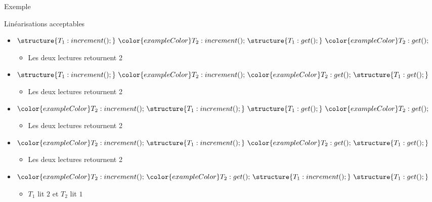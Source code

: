\begin{frame}[fragile]{Exemple}
\begin{center}
{\begin{tikzpicture}
      \end{tikzpicture}
    }
  \end{center}
  \pause
  \begin{alertblock}{Linéarisations acceptables}
    \begin{itemize}
    \item $\structure{T_1:increment();}~{\color{exampleColor}T_2:increment();}~\structure{T_1:get();}~{\color{exampleColor}T_2:get();}$
      \begin{itemize}
      \item Les deux lectures retournent 2
      \end{itemize}
      \pause
    \item $\structure{T_1:increment();}~{\color{exampleColor}T_2:increment();}~{\color{exampleColor}T_2:get();}~\structure{T_1:get();}$
      \begin{itemize}
      \item Les deux lectures retournent 2
      \end{itemize}
      \pause
    \item ${\color{exampleColor}T_2:increment();}~\structure{T_1:increment();}~\structure{T_1:get();}~{\color{exampleColor}T_2:get();}$
      \begin{itemize}
      \item Les deux lectures retournent 2
      \end{itemize}
      \pause
    \item ${\color{exampleColor}T_2:increment();}~\structure{T_1:increment();}~{\color{exampleColor}T_2:get();}~\structure{T_1:get();}$
      \begin{itemize}
      \item Les deux lectures retournent 2
      \end{itemize}
      \pause
    \item ${\color{exampleColor}T_2:increment();}~{\color{exampleColor}T_2:get();}~\structure{T_1:increment();}~\structure{T_1:get();}$
      \begin{itemize}
      \item $T_1$ lit $2$ et $T_2$ lit $1$
      \end{itemize}
    \end{itemize}
  \end{alertblock}

\end{frame}

\endgroup
\endinput

